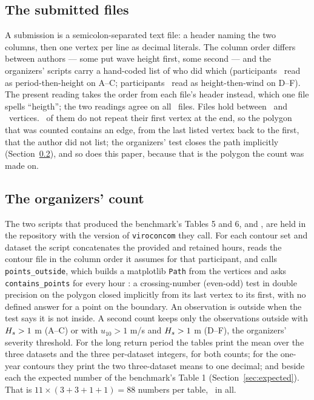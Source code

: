 \documentclass[preprint,11pt,authoryear]{elsarticle}
\begin{document}
\subsection{The submitted files}
A submission is a semicolon-separated text file: a header naming the two columns, then one vertex per line as decimal literals. The column order differs between authors --- some put wave height first, some second --- and the organizers' scripts carry a hand-coded list of who did which (participants \EAbcHsSecond\ read as period-then-height on A--C; participants \EDefHsFirst\ read as height-then-wind on D--F). The present reading takes the order from each file's header instead, which one file spells ``heigth''; the two readings agree on all \EContours\ files. Files hold between \EVerticesMin\ and \EVerticesMax\ vertices. \ENotClosed\ of them do not repeat their first vertex at the end, so the polygon that was counted contains an edge, from the last listed vertex back to the first, that the author did not list; the organizers' test closes the path implicitly (Section~\ref{sec:count}), and so does this paper, because that is the polygon the count was made on.

\subsection{The organizers' count}\label{sec:count}
The two scripts that produced the benchmark's Tables 5 and 6,  and , are held in the repository with the version of \texttt{viroconcom} \citep{haselsteiner2019viroconcom} they call. For each contour set and dataset the script concatenates the provided and retained hours, reads the contour file in the column order it assumes for that participant, and calls \texttt{points\_outside}, which builds a matplotlib \texttt{Path} from the vertices and asks \texttt{contains\_points} for every hour \citep{hunter2007}: a crossing-number (even-odd) test in double precision on the polygon closed implicitly from its last vertex to its first, with no defined answer for a point on the boundary. An observation is outside when the test says it is not inside. A second count keeps only the observations outside with $H_s > 1$ m (A--C) or with $u_{10} > 1$ m/s and $H_s > 1$ m (D--F), the organizers' severity threshold. For the long return period the tables print the mean over the three datasets and the three per-dataset integers, for both counts; for the one-year contours they print the two three-dataset means to one decimal; and beside each the expected number of the benchmark's Table 1 (Section~\ref{sec:expected}). That is $11 \times (3 + 3 + 1 + 1) = 88$ numbers per table, \EComparisons\ in all.
\end{document}
